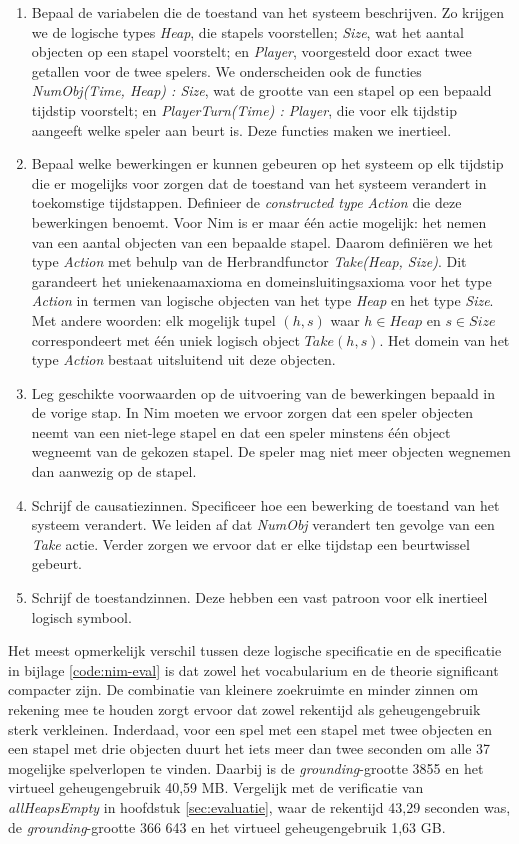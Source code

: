 \begin{enumerate}
	\item Bepaal de variabelen die de toestand van het systeem beschrijven. Zo krijgen we de logische types \textit{Heap}, die stapels voorstellen; \textit{Size}, wat het aantal objecten op een stapel voorstelt; en \textit{Player}, voorgesteld door exact twee getallen voor de twee spelers. We onderscheiden ook de functies \textit{NumObj(Time, Heap) : Size}, wat de grootte van een stapel op een bepaald tijdstip voorstelt; en \textit{PlayerTurn(Time) : Player}, die voor elk tijdstip aangeeft welke speler aan beurt is. Deze functies maken we inertieel.
	\item Bepaal welke bewerkingen er kunnen gebeuren op het systeem op elk tijdstip die er mogelijks voor zorgen dat de toestand van het systeem verandert in toekomstige tijdstappen. Definieer de \textit{constructed type Action} die deze bewerkingen benoemt. Voor Nim is er maar \'e\'en actie mogelijk: het nemen van een aantal objecten van een bepaalde stapel. Daarom defini\"eren we het type \textit{Action} met behulp van de Herbrandfunctor \textit{Take(Heap, Size)}. Dit garandeert het uniekenaamaxioma en domeinsluitingsaxioma voor het type \textit{Action} in termen van logische objecten van het type \textit{Heap} en het type \textit{Size}.\cite{DeCatBroes2014PLaa} Met andere woorden: elk mogelijk tupel $(h, s)$ waar $h \in Heap$ en $s \in Size$ correspondeert met \'e\'en uniek logisch object $Take(h, s)$. Het domein van het type \textit{Action} bestaat uitsluitend uit deze objecten.
	\item Leg geschikte voorwaarden op de uitvoering van de bewerkingen bepaald in de vorige stap. In Nim moeten we ervoor zorgen dat een speler objecten neemt van een niet-lege stapel en dat een speler minstens \'e\'en object wegneemt van de gekozen stapel. De speler mag niet meer objecten wegnemen dan aanwezig op de stapel.
	\item Schrijf de causatiezinnen. Specificeer hoe een bewerking de toestand van het systeem verandert. We leiden af dat \textit{NumObj} verandert ten gevolge van een \textit{Take} actie. Verder zorgen we ervoor dat er elke tijdstap een beurtwissel gebeurt.
	\item Schrijf de toestandzinnen. Deze hebben een vast patroon voor elk inertieel logisch symbool.
\end{enumerate}

Het meest opmerkelijk verschil tussen deze logische specificatie en de specificatie in bijlage \ref{code:nim-eval} is dat zowel het vocabularium en de theorie significant compacter zijn. De combinatie van kleinere zoekruimte en minder zinnen om rekening mee te houden zorgt ervoor dat zowel rekentijd als geheugengebruik sterk verkleinen. Inderdaad, voor een spel met een stapel met twee objecten en een stapel met drie objecten duurt het iets meer dan twee seconden om alle 37 mogelijke spelverlopen te vinden. Daarbij is de \textit{grounding}-grootte 3855 en het virtueel geheugengebruik 40,59 MB. Vergelijk met de verificatie van \textit{allHeapsEmpty} in hoofdstuk \ref{sec:evaluatie}, waar de rekentijd 43,29 seconden was, de \textit{grounding}-grootte 366 643 en het virtueel geheugengebruik 1,63 GB.

